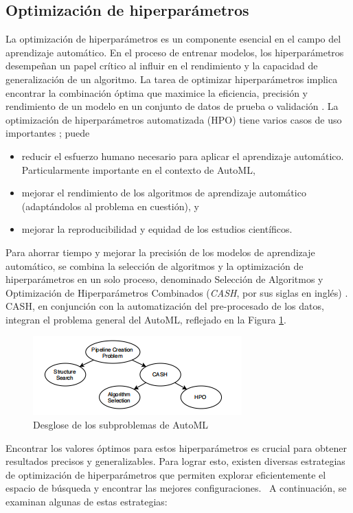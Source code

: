 \subsection{Optimización de hiperparámetros} \label{epig:hpo}
La optimización de hiperparámetros es un componente esencial en el campo del aprendizaje automático. En el proceso de entrenar modelos, los hiperparámetros desempeñan un papel crítico al influir en el rendimiento y la capacidad de generalización de un algoritmo. La tarea de optimizar hiperparámetros implica encontrar la combinación óptima que maximice la eficiencia, precisión y rendimiento de un modelo en un conjunto de datos de prueba o validación  \citep{hastie2009elements}. La optimización de hiperparámetros automatizada (HPO) tiene varios casos de uso importantes  \citep{hutter2019automated}; puede
\begin{itemize}
	\item reducir el esfuerzo humano necesario para aplicar el aprendizaje automático. Particularmente importante en el contexto de AutoML,
	\item mejorar el rendimiento de los algoritmos de aprendizaje automático (adaptándolos al problema en cuestión), y
	\item mejorar la reproducibilidad y equidad de los estudios científicos.
\end{itemize}
Para ahorrar tiempo y mejorar la precisión de los modelos de aprendizaje automático, se combina la selección de algoritmos y la optimización de hiperparámetros en un solo proceso, denominado Selección de Algoritmos y Optimización de Hiperparámetros Combinados (\textit{CASH}, por sus siglas en inglés) \citep{tuggener2019automated}. CASH, en conjunción con la automatización del pre-procesado de los datos, integran el problema general del AutoML, reflejado en la Figura \ref{fig:desglose-de-los-subproblemas-de-automl}. 

\begin{figure}[H]
	\centering
	\includegraphics[width=0.4\linewidth]{"figuras/capi 1/Desglose de los subproblemas de AutoML"}
	\caption{Desglose de los subproblemas de AutoML \citep{zoller2021benchmark}}
	\label{fig:desglose-de-los-subproblemas-de-automl}
\end{figure} 

Encontrar los valores óptimos para estos hiperparámetros es crucial para obtener resultados precisos y generalizables. Para lograr esto, existen diversas estrategias de optimización de hiperparámetros que permiten explorar eficientemente el espacio de búsqueda y encontrar las mejores configuraciones.  A continuación, se examinan algunas de estas estrategias:

